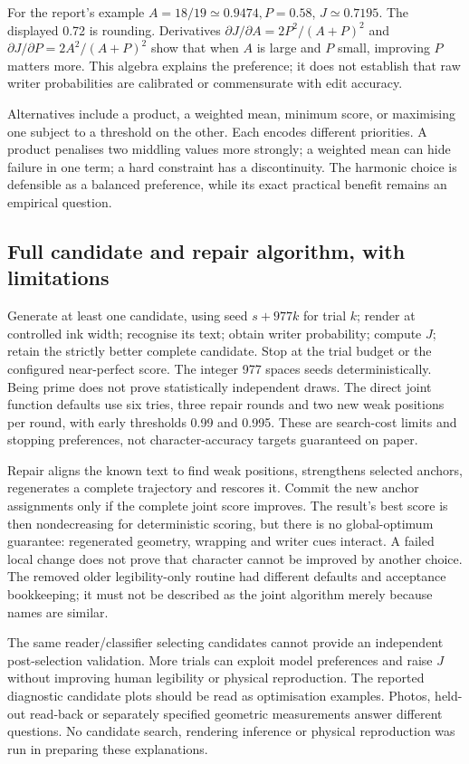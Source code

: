 For the report's example $A=18/19\simeq0.9474,P=0.58$, $J\simeq0.7195$.
The displayed 0.72 is rounding. Derivatives
$\partial J/\partial A=2P^2/(A+P)^2$ and
$\partial J/\partial P=2A^2/(A+P)^2$ show that when $A$ is large and
$P$ small, improving $P$ matters more. This algebra explains the preference;
it does not establish that raw writer probabilities are calibrated or
commensurate with edit accuracy.

Alternatives include a product, a weighted mean, minimum score, or maximising
one subject to a threshold on the other. Each encodes different priorities.
A product penalises two middling values more strongly; a weighted mean can
hide failure in one term; a hard constraint has a discontinuity. The harmonic
choice is defensible as a balanced preference, while its exact practical
benefit remains an empirical question.

\subsection{Full candidate and repair algorithm, with limitations}
Generate at least one candidate, using seed $s+977k$ for trial $k$;
render at controlled ink width; recognise its text; obtain writer probability;
compute $J$; retain the strictly better complete candidate. Stop at the trial
budget or the configured near-perfect score. The integer 977 spaces seeds
deterministically. Being prime does not prove statistically independent draws.
The direct joint function defaults use six tries, three repair rounds and two new
weak positions per round, with early thresholds 0.99 and 0.995. These are
search-cost limits and stopping preferences, not character-accuracy targets
guaranteed on paper.

Repair aligns the known text to find weak positions, strengthens selected
anchors, regenerates a complete trajectory and rescores it. Commit the
new anchor assignments only if the complete joint score improves. The
result's best score is then nondecreasing for deterministic scoring, but
there is no global-optimum guarantee: regenerated geometry, wrapping and
writer cues interact. A failed local change does not prove that character
cannot be improved by another choice. The removed older legibility-only routine had
different defaults and acceptance bookkeeping; it must not be described as
the joint algorithm merely because names are similar.

The same reader/classifier selecting candidates cannot provide an independent
post-selection validation. More trials can exploit model preferences and
raise $J$ without improving human legibility or physical reproduction.
The reported diagnostic candidate plots should be read as optimisation
examples. Photos, held-out read-back or separately specified geometric
measurements answer different questions. No candidate search, rendering
inference or physical reproduction was run in preparing these explanations.
